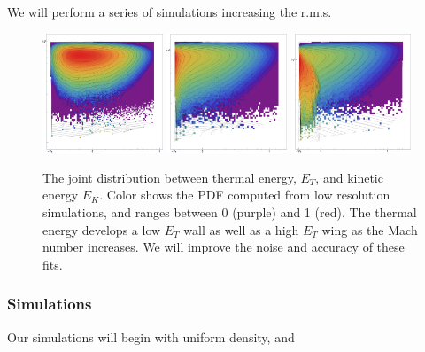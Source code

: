 We will perform a series of simulations increasing the r.m.s. 
\begin{figure} \begin{center}
\includegraphics[width=0.32\textwidth]{figs/mach5_contours_comparison_V_MCMC.png}
\includegraphics[width=0.32\textwidth]{figs/mach10_contours_comparison_V_MCMC.png}
\includegraphics[width=0.32\textwidth]{figs/mach20_contours_comparison_V_MCMC.png}
\caption[ ]{The joint distribution between thermal energy, $E_T$, and kinetic
energy $E_K$. Color shows the PDF computed from low resolution simulations, and ranges between 0 (purple) and 1
(red).  The thermal energy develops a low $E_T$ wall as well as a high $E_T$
wing as the Mach number increases.  We will improve the noise and accuracy of
these fits.}
\label{} \end{center} \end{figure}

\subsubsection{Simulations}
\label{subsec.turb_sims}

Our simulations will begin with uniform density, and 


